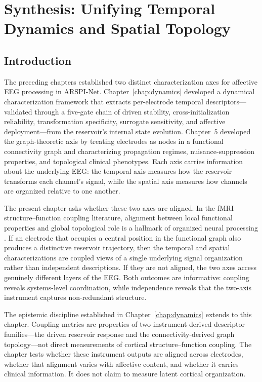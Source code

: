 \chapter{Synthesis: Unifying Temporal Dynamics and Spatial Topology}
\label{chap:synthesis}

\section{Introduction}
\label{sec:ch7_intro}

The preceding chapters established two distinct characterization axes for affective EEG processing in ARSPI-Net. Chapter~\ref{chap:dynamics} developed a dynamical characterization framework that extracts per-electrode temporal descriptors---validated through a five-gate chain of driven stability, cross-initialization reliability, transformation specificity, surrogate sensitivity, and affective deployment---from the reservoir's internal state evolution. Chapter~5 developed the graph-theoretic axis by treating electrodes as nodes in a functional connectivity graph and characterizing propagation regimes, nuisance-suppression properties, and topological clinical phenotypes. Each axis carries information about the underlying EEG: the temporal axis measures how the reservoir transforms each channel's signal, while the spatial axis measures how channels are organized relative to one another.

The present chapter asks whether these two axes are aligned. In the fMRI structure--function coupling literature, alignment between local functional properties and global topological role is a hallmark of organized neural processing \cite{Deco2015,honey_network_2007,suarez_linking_2020}. If an electrode that occupies a central position in the functional graph also produces a distinctive reservoir trajectory, then the temporal and spatial characterizations are coupled views of a single underlying signal organization rather than independent descriptions. If they are not aligned, the two axes access genuinely different layers of the EEG. Both outcomes are informative: coupling reveals systems-level coordination, while independence reveals that the two-axis instrument captures non-redundant structure.

The epistemic discipline established in Chapter~\ref{chap:dynamics} extends to this chapter. Coupling metrics are properties of two instrument-derived descriptor families---the driven reservoir response and the connectivity-derived graph topology---not direct measurements of cortical structure--function coupling. The chapter tests whether these instrument outputs are aligned across electrodes, whether that alignment varies with affective content, and whether it carries clinical information. It does not claim to measure latent cortical organization.

